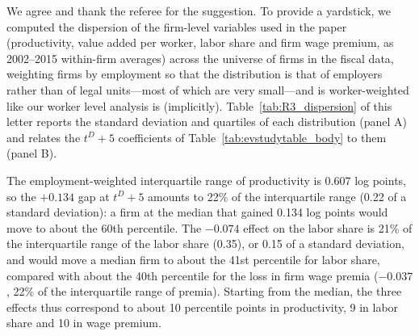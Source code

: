\documentclass[11pt]{article}
\newcommand{\answer}[1]{\begingroup\color{navy}#1\endgroup}
\begin{document}
\begin{enumerate}[leftmargin=*]
\answer{We agree and thank the referee for the suggestion. To provide a yardstick, we computed the dispersion of the firm-level variables used in the paper (productivity, value added per worker, labor share and firm wage premium, as 2002--2015 within-firm averages) across the universe of firms in the fiscal data, weighting firms by employment so that the distribution is that of employers rather than of legal units---most of which are very small---and is worker-weighted like our worker level analysis is (implicitly). Table~\ref{tab:R3_dispersion} of this letter reports the standard deviation and quartiles of each distribution (panel A) and relates the $t^D+5$ coefficients of Table~\ref{tab:evstudytable_body} to them (panel B).

The employment-weighted interquartile range of productivity is 0.607 log points, so the $+0.134$ gap at $t^D+5$ amounts to 22\% of the interquartile range (0.22 of a standard deviation): a firm at the median that gained 0.134 log points would move to about the 60th percentile. The $-0.074$ effect on the labor share is 21\% of the interquartile range of the labor share (0.35), or 0.15 of a standard deviation, and would move a median firm to about the 41st percentile for labor share, compared with about the 40th percentile for the loss in firm wage premia ($-0.037$, 22\% of the interquartile range of premia). Starting from the median, the three effects thus correspond to about 10 percentile points in productivity, 9 in labor share and 10 in wage premium.


}
\end{enumerate}
\end{document}
